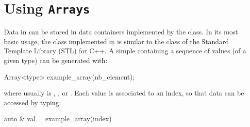 

\section{Using \texttt{Arrays}}

Data in \akantu can be stored in data containers implemented by
the  class. In its most basic usage, the  class
implemented in \akantu is similar to the  class of
the Standard Template Library (STL) for C++. A simple 
containing a sequence of  values (of a given type) can be generated with:
\begin{cpp}
  Array<type> example_array(nb_element);
\end{cpp}
where  usually is , ,  or
. Each value is associated to an index, so that data can be
accessed by typing:

\begin{cpp}
  auto & val = example_array(index)
\end{cpp}

